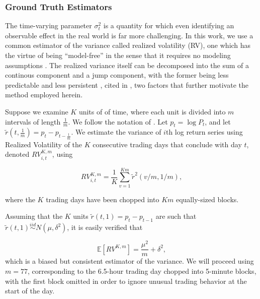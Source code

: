 \documentclass{beamer}
\newcommand{\simiid}{\stackrel{iid}{\sim}} %
\def\E{\mathbb{E}} %
\theoremstyle{definition}
\begin{document}
\begin{frame}
\frametitle{Ground Truth Estimators}

The time-varying parameter $\sigma^{2}_{t}$ is a quantity for which even identifying an observable effect in the real world is far more challenging.  In this work, we use a common estimator of the variance called realized volatility (RV), one which has the virtue of being ``model-free'' in the sense that it requires no modeling assumptions \parencite[][]{andersen2010stochastic}.  The realized variance itself can be decomposed into the sum of a continous component and a jump component, with the former being less predictable and less persistent \parencite[][]{andersen2007roughing}, cited in \cite[][]{de2006forecasting}, two factors that further motivate the method employed herein.
    
Suppose we examine $K$ units of of time, where each unit is divided into $m$ intervals of length $\frac{1}{m}$.  We follow the notation of \parencite[][]{andersen2009realized}. Let $p_{t} = \log{P_{t}}$, and let $\tilde{r}(t,\frac{1}{m}) = p_{t} - p_{t-\frac{1}{m}}$.  We estimate the variance of $i$th log return series using Realized Volatility of the $K$ consecutive trading days that conclude with day $t$, denoted $RV_{i,t}^{K,m}$, using

$$RV_{i,t}^{K,m} = \frac{1}{K}\sum^{Km}_{v=1}\tilde{r}^{2}(v/m,1/m),$$

where the $K$ trading days have been chopped into $Km$ equally-sized blocks.

Assuming that the $K$ units $\tilde{r}(t, 1) = p_{t} - p_{t-1}$ are such that $\tilde{r}(t, 1) \simiid N(\mu, \delta^{2})$, it is easily verified that 

$$\E[RV^{K,m}] = \frac{\mu^{2}}{m} + \delta^{2},$$
which is a biased but consistent estimator of the variance.  We will proceed using $m = 77$, corresponding to the 6.5-hour trading day chopped into 5-minute blocks, with the first block omitted in order to ignore unusual trading behavior at the start of the day.

\end{frame}
\end{document}
